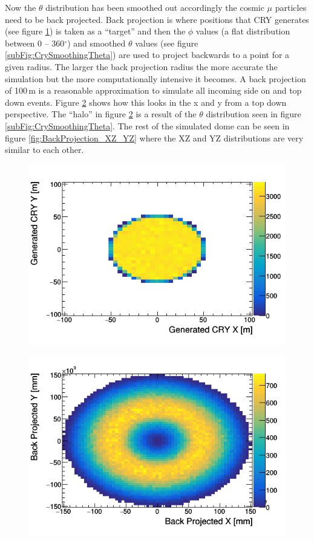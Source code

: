 Now the $\theta$ distribution has been smoothed out accordingly the cosmic $\mu$ particles need to be back projected. Back projection is where positions that CRY generates (see figure \ref{fig:cryxm_vs_cryym}) is taken as a ``target'' and then the $\phi$ values (a flat distribution between 0 -- 360$^\circ$) and smoothed $\theta$ values (see figure \ref{subFig:CrySmoothingTheta}) are used to project backwards to a point for a given radius. The larger the back projection radius the more accurate the simulation but the more computationally intensive it becomes. A back projection of 100\,m is a reasonable approximation to simulate all incoming side on and top down events. Figure \ref{fig:BackProjectionXY} shows how this looks in the x and y from a top down perspective. The ``halo'' in figure \ref{fig:BackProjectionXY} is a result of the $\theta$ distribution seen in figure \ref{subFig:CrySmoothingTheta}. The rest of the simulated dome can be seen in figure \ref{fig:BackProjection_XZ_YZ} where the XZ and YZ distributions are very similar to each other. 

\begin{figure}[htbp]
 \centering
 \includegraphics[width=0.7\linewidth]{Chapter4/Figs/Raster/CryPlots/cryxm_vs_cryym.png}
 \label{fig:cryxm_vs_cryym}
\end{figure}

\begin{figure}[htbp]
 \centering
 \includegraphics[width=0.7\linewidth]{Chapter4/Figs/Raster/CryPlots/BackProjectionXY.png}
 \label{fig:BackProjectionXY}
\end{figure}

